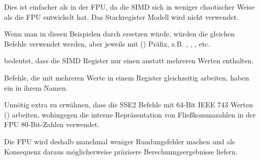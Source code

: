 Dies ist einfacher als in der FPU, da die SIMD sich in weniger chaotischer Weise als die FPU entwickelt hat.
Das Stackregister Modell wird nicht verwendet.

Wenn man in diesen Beispielen \Tdouble durch \Tfloat ersetzen würde, würden die gleichen Befehle verwendet werden, aber
jeweils mit () Präfix, z.B. , , , etc.

 bedeutet, dass die SIMD Register nur einen anstatt mehreren Werten enthalten.

Befehle, die mit mehreren Werte in einem Register gleichzeitig arbeiten, haben ein  in ihrem Namen.

Unnötig extra zu erwähnen, dass die SSE2 Befehle mit 64-Bit IEEE 743 Werten (\Tdouble) arbeiten, wohingegen die interne
Repräsentation von Fließkommazahlen in der FPU 80-Bit-Zahlen verwendet.

Die FPU wird deshalb manchmal weniger Rundungsfehler machen und als Konsequenz daraus möglicherweise präzisere
Berechnungsergebnisse liefern.
